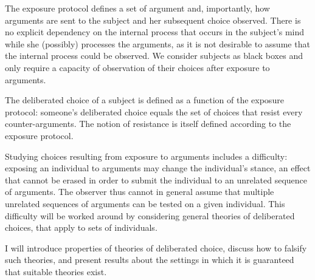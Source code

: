 \documentclass[version=last, pagesize, twoside=off, bibliography=totoc, DIV=calc, fontsize=12pt, a4paper, french, english]{scrartcl}
\begin{document}
The exposure protocol defines a set of argument and, importantly, how arguments are sent to the subject and her subsequent choice observed. There is no explicit dependency on the internal process that occurs in the subject’s mind while she (possibly) processes the arguments, as it is not desirable to assume that the internal process could be observed. We consider subjects as black boxes and only require a capacity of observation of their choices after exposure to arguments.

The deliberated choice of a subject is defined as a function of the exposure protocol: someone’s deliberated choice equals the set of choices that resist every counter-arguments. The notion of resistance is itself defined according to the exposure protocol.

Studying choices resulting from exposure to arguments includes a difficulty: exposing an individual to arguments may change the individual’s stance, an effect that cannot be erased in order to submit the individual to an unrelated sequence of arguments. The observer thus cannot in general assume that multiple unrelated sequences of arguments can be tested on a given individual. This difficulty will be worked around by considering general theories of deliberated choices, that apply to sets of individuals. 

I will introduce properties of theories of deliberated choice, discuss how to falsify such theories, and present results about the settings in which it is guaranteed that suitable theories exist.


\end{document}
